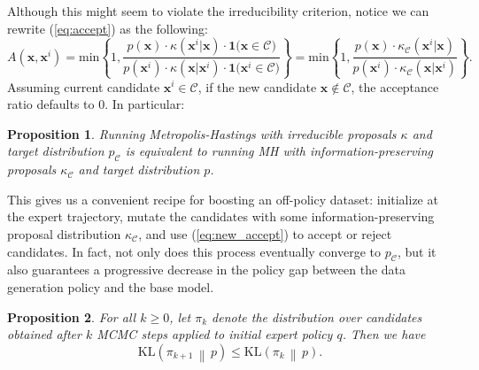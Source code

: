 \documentclass{article}
\newtheorem{proposition}{Proposition}
\begin{document}
Although this might seem to violate the irreducibility criterion, notice we can rewrite (\ref{eq:accept}) as the following: 
\begin{equation}\label{eq:new_accept}
    A(\mathbf{x}, \mathbf{x}^i) = \text{min} \left\lbrace 1, \frac{p(\mathbf{x}) \cdot \kappa(\mathbf{x}^i | \mathbf{x}) \cdot 
    \mathbf{1}\bigl(\mathbf{x} \in \mathcal{C}\bigr)}{p(\mathbf{x}^i) \cdot \kappa(\mathbf{x}|\mathbf{x}^i) \cdot 
    \mathbf{1}\bigl(\mathbf{x}^i \in \mathcal{C}\bigr)}\right\rbrace = \text{min} \left\lbrace 1, \frac{p(\mathbf{x}) \cdot \kappa_{\mathcal{C}}(\mathbf{x}^i | \mathbf{x})}{p(\mathbf{x}^i) \cdot \kappa_{\mathcal{C}}(\mathbf{x}|\mathbf{x}^i)}\right\rbrace.
\end{equation}
Assuming current candidate $\mathbf{x}^i \in \mathcal{C}$, if the new candidate $\mathbf{x} \notin \mathcal{C}$, the acceptance ratio defaults to $0$. In particular: 

\begin{proposition}
Running Metropolis-Hastings with irreducible proposals $\kappa$ and target distribution $p_{\mathcal{C}}$ is equivalent to running MH with information-preserving proposals $\kappa_{\mathcal{C}}$ and target distribution $p$.
\end{proposition}


This gives us a convenient recipe for boosting an off-policy dataset: initialize at the expert trajectory, mutate the candidates with some information-preserving proposal distribution $\kappa_{\mathcal{C}}$, and use (\ref{eq:new_accept}) to accept or reject candidates. In fact, not only does this process eventually converge to $p_{\mathcal{C}}$, but it also guarantees a progressive decrease in the policy gap between the data generation policy and the base model.


\begin{proposition}\label{prop:scale}
    For all $k \geq 0$, let $\pi_k$ denote the distribution over candidates obtained after $k$ MCMC steps applied to initial expert policy $q$. Then we have
    \begin{equation}
        \mathrm{KL}\!\left(
        \pi_{k+1}
        \,\middle\|\,
        p
    \right) \leq \mathrm{KL}\!\left(
        \pi_{k}
        \,\middle\|\,
        p
    \right).
    \end{equation}
\end{proposition}
\end{document}
